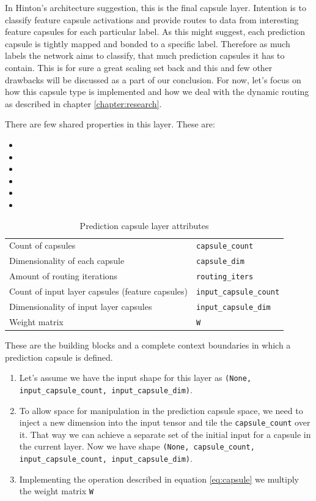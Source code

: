 In Hinton's \cite{capsule} architecture suggestion, this is the final capsule layer. Intention is to classify feature capsule activations and provide routes to data from interesting feature capsules
for each particular label. As this might suggest, each prediction capsule is tightly mapped and bonded to a specific label. Therefore as much labels the network aims to classify, that much prediction capsules it has to contain. This is for sure a great scaling set back and this and few other drawbacks will be discussed as a part of our conclusion. For now, let's focus on how this capsule type is implemented and how we deal with the dynamic routing as described in chapter \ref{chapter:research}.

There are few shared properties in this layer. These are:

\begin{itemize}
    \item
    \item
    \item
    \item
    \item
    \item
\end{itemize}

\begin{table}[ht]
    \centering
    \begin{tabularx}{.8\textwidth}{l|X}
        \toprule
        Count of capsules & \texttt{capsule\_count} \\
        Dimensionality of each capsule & \texttt{capsule\_dim} \\
        Amount of routing iterations & \texttt{routing\_iters} \\
        Count of input layer capsules (feature capsules) & \texttt{input\_capsule\_count} \\
        Dimensionality of input layer capsules & \texttt{input\_capsule\_dim} \\
        Weight matrix & \texttt{W} \\
        \bottomrule
    \end{tabularx}
    \caption{Prediction capsule layer attributes}
\end{table}

These are the building blocks and a complete context boundaries in which a prediction capsule is defined.

\begin{enumerate}
    \item Let's assume we have the input shape for this layer as \texttt{(None, input\_capsule\_count, input\_capsule\_dim)}.
    \item To allow space for manipulation in the prediction capsule space, we need to inject a new dimension into the input tensor and tile the \texttt{capsule\_count} over it. That way we can achieve a separate set of the initial input for a capsule in the current layer. Now we have shape \texttt{(None, capsule\_count, input\_capsule\_count, input\_capsule\_dim)}.
    \item Implementing the operation described in equation \ref{eq:capsule} we multiply the weight matrix \texttt{W}
\end{enumerate}

